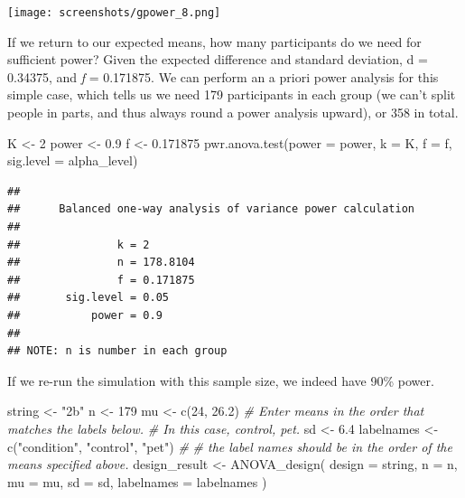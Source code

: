 \documentclass[
]{book}
\newenvironment{Shaded}{\begin{snugshade}}{\end{snugshade}}
\newcommand{\AttributeTok}[1]{\textcolor[rgb]{0.77,0.63,0.00}{#1}}
\newcommand{\CommentTok}[1]{\textcolor[rgb]{0.56,0.35,0.01}{\textit{#1}}}
\newcommand{\DecValTok}[1]{\textcolor[rgb]{0.00,0.00,0.81}{#1}}
\newcommand{\FloatTok}[1]{\textcolor[rgb]{0.00,0.00,0.81}{#1}}
\newcommand{\FunctionTok}[1]{\textcolor[rgb]{0.00,0.00,0.00}{#1}}
\newcommand{\NormalTok}[1]{#1}
\newcommand{\OtherTok}[1]{\textcolor[rgb]{0.56,0.35,0.01}{#1}}
\newcommand{\StringTok}[1]{\textcolor[rgb]{0.31,0.60,0.02}{#1}}
\begin{document}
\texttt{[image: screenshots/gpower\_8.png]}

If we return to our expected means, how many participants do we need for sufficient power? Given the expected difference and standard deviation, d = 0.34375, and \emph{f} = 0.171875. We can perform an a priori power analysis for this simple case, which tells us we need 179 participants in each group (we can't split people in parts, and thus always round a power analysis upward), or 358 in total.

\begin{Shaded}
\begin{Highlighting}[]
\NormalTok{K }\OtherTok{\textless{}{-}} \DecValTok{2}
\NormalTok{power }\OtherTok{\textless{}{-}} \FloatTok{0.9}
\NormalTok{f }\OtherTok{\textless{}{-}} \FloatTok{0.171875}
\FunctionTok{pwr.anova.test}\NormalTok{(}\AttributeTok{power =}\NormalTok{ power,}
               \AttributeTok{k =}\NormalTok{ K,}
               \AttributeTok{f =}\NormalTok{ f,}
               \AttributeTok{sig.level =}\NormalTok{ alpha\_level)}
\end{Highlighting}
\end{Shaded}

\begin{verbatim}
## 
##      Balanced one-way analysis of variance power calculation 
## 
##               k = 2
##               n = 178.8104
##               f = 0.171875
##       sig.level = 0.05
##           power = 0.9
## 
## NOTE: n is number in each group
\end{verbatim}

If we re-run the simulation with this sample size, we indeed have 90\% power.

\begin{Shaded}
\begin{Highlighting}[]
\NormalTok{string }\OtherTok{\textless{}{-}} \StringTok{"2b"}
\NormalTok{n }\OtherTok{\textless{}{-}} \DecValTok{179}
\NormalTok{mu }\OtherTok{\textless{}{-}} \FunctionTok{c}\NormalTok{(}\DecValTok{24}\NormalTok{, }\FloatTok{26.2}\NormalTok{)}
\CommentTok{\# Enter means in the order that matches the labels below.}
\CommentTok{\# In this case, control, pet.}
\NormalTok{sd }\OtherTok{\textless{}{-}} \FloatTok{6.4}
\NormalTok{labelnames }\OtherTok{\textless{}{-}} \FunctionTok{c}\NormalTok{(}\StringTok{"condition"}\NormalTok{, }\StringTok{"control"}\NormalTok{, }\StringTok{"pet"}\NormalTok{) }\CommentTok{\#}
\CommentTok{\# the label names should be in the order of the means specified above.}
\NormalTok{design\_result }\OtherTok{\textless{}{-}} \FunctionTok{ANOVA\_design}\NormalTok{(}
\AttributeTok{design =}\NormalTok{ string,}
\AttributeTok{n =}\NormalTok{ n,}
\AttributeTok{mu =}\NormalTok{ mu,}
\AttributeTok{sd =}\NormalTok{ sd,}
\AttributeTok{labelnames =}\NormalTok{ labelnames}
\NormalTok{)}
\end{Highlighting}
\end{Shaded}
\end{document}
